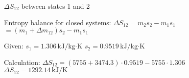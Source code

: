 \( \Delta S_{12} \) between states 1 and 2  

Entropy balance for closed systems:  
\( \Delta S_{12} = m_2 s_2 - m_1 s_1 \)  
\( = (m_1 + \Delta m_{12}) s_2 - m_1 s_1 \)  

Given:  
\( s_1 = 1.306 \, \text{kJ/kg·K} \)  
\( s_2 = 0.9519 \, \text{kJ/kg·K} \)  

Calculation:  
\( \Delta S_{12} = (5755 + 3474.3) \cdot 0.9519 - 5755 \cdot 1.306 \)  
\( \Delta S_{12} = 1292.14 \, \text{kJ/K} \)